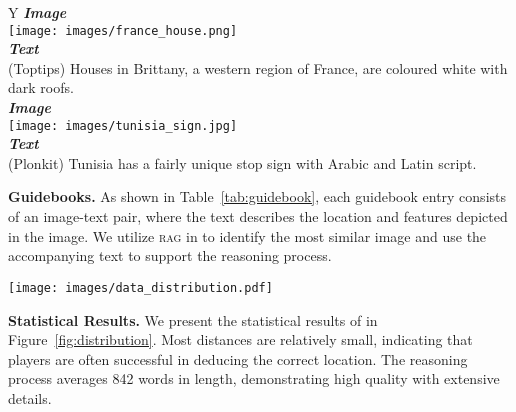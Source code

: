 \begin{table}[htbp]
\centering
\small
    \begin{tabularx}{\linewidth}{Y}
    \toprule 
        \textit{\textbf{Image}} \\
        \texttt{[image: images/france\_house.png]} \\
        \midrule
        \textit{\textbf{Text}} \\
        (Toptips) Houses in Brittany, a western region of France, are coloured white with dark roofs. \\
    \toprule 
        \textit{\textbf{Image}} \\
        \texttt{[image: images/tunisia\_sign.jpg]} \\
        \midrule
        \textit{\textbf{Text}} \\
        (Plonkit) Tunisia has a fairly unique stop sign with Arabic and Latin script. \\
    \bottomrule
\end{tabularx}
\caption{
Examples of clues in the two guidebooks, Toptips and Plonkit. The data is constructed as image-text pairs in the guidebooks.
}
\label{tab:guidebook}
\end{table}


\textbf{Guidebooks.} As shown in Table~\ref{tab:guidebook}, each guidebook entry consists of an image-text pair, where the text describes the location and features depicted in the image. We utilize \textsc{rag} in \modelname to identify the most similar image and use the accompanying text to support the reasoning process.


\begin{figure*}[t]
    \centering
    \texttt{[image: images/data\_distribution.pdf]} 
    \caption{Distribution of Distance (left) and Length of Reasoning (right) in \dataname.}
    \label{fig:distribution}
\end{figure*}


\textbf{Statistical Results.} We present the statistical results of \dataname in Figure~\ref{fig:distribution}. Most distances are relatively small, indicating that players are often successful in deducing the correct location. The reasoning process averages 842 words in length, demonstrating high quality with extensive details.


